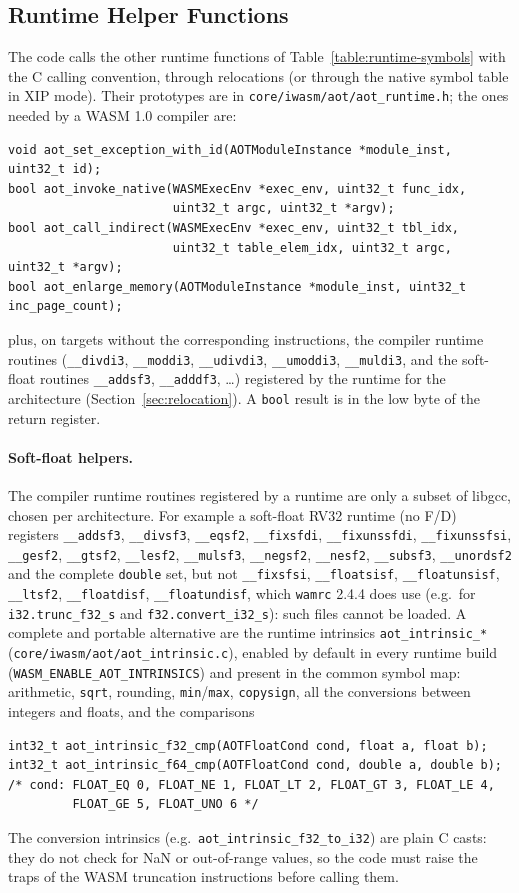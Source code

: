 \documentclass{article}
\begin{document}
\subsection{Runtime Helper Functions}
\label{sec:abi-runtime-calls}
The code calls the other runtime functions of Table~\ref{table:runtime-symbols} with the C calling convention, through relocations (or through the native symbol table in XIP mode).
Their prototypes are in \texttt{core/iwasm/aot/aot\_runtime.h}; the ones needed by a WASM 1.0 compiler are:
\begin{verbatim}
void aot_set_exception_with_id(AOTModuleInstance *module_inst, uint32_t id);
bool aot_invoke_native(WASMExecEnv *exec_env, uint32_t func_idx,
                       uint32_t argc, uint32_t *argv);
bool aot_call_indirect(WASMExecEnv *exec_env, uint32_t tbl_idx,
                       uint32_t table_elem_idx, uint32_t argc, uint32_t *argv);
bool aot_enlarge_memory(AOTModuleInstance *module_inst, uint32_t inc_page_count);
\end{verbatim}
plus, on targets without the corresponding instructions, the compiler runtime routines (\verb|__divdi3|, \verb|__moddi3|, \verb|__udivdi3|, \verb|__umoddi3|, \verb|__muldi3|, and the soft-float routines \verb|__addsf3|, \verb|__adddf3|, \dots) registered by the runtime for the architecture (Section~\ref{sec:relocation}).
A \verb|bool| result is in the low byte of the return register.

\paragraph{Soft-float helpers.}
The compiler runtime routines registered by a runtime are only a subset of libgcc, chosen per architecture.
For example a soft-float RV32 runtime (no F/D) registers \verb|__addsf3|, \verb|__divsf3|, \verb|__eqsf2|, \verb|__fixsfdi|, \verb|__fixunssfdi|, \verb|__fixunssfsi|, \verb|__gesf2|, \verb|__gtsf2|, \verb|__lesf2|, \verb|__mulsf3|, \verb|__negsf2|, \verb|__nesf2|, \verb|__subsf3|, \verb|__unordsf2| and the complete \verb|double| set, but not \verb|__fixsfsi|, \verb|__floatsisf|, \verb|__floatunsisf|, \verb|__ltsf2|, \verb|__floatdisf|, \verb|__floatundisf|, which \texttt{wamrc} 2.4.4 does use (e.g.\ for \verb|i32.trunc_f32_s| and \verb|f32.convert_i32_s|): such files cannot be loaded.
A complete and portable alternative are the runtime intrinsics \verb|aot_intrinsic_*| (\texttt{core/iwasm/aot/aot\_intrinsic.c}), enabled by default in every runtime build (\verb|WASM_ENABLE_AOT_INTRINSICS|) and present in the common symbol map: arithmetic, \verb|sqrt|, rounding, \verb|min|/\verb|max|, \verb|copysign|, all the conversions between integers and floats, and the comparisons
\begin{verbatim}
int32_t aot_intrinsic_f32_cmp(AOTFloatCond cond, float a, float b);
int32_t aot_intrinsic_f64_cmp(AOTFloatCond cond, double a, double b);
/* cond: FLOAT_EQ 0, FLOAT_NE 1, FLOAT_LT 2, FLOAT_GT 3, FLOAT_LE 4,
         FLOAT_GE 5, FLOAT_UNO 6 */
\end{verbatim}
The conversion intrinsics (e.g.\ \verb|aot_intrinsic_f32_to_i32|) are plain C casts: they do not check for NaN or out-of-range values, so the code must raise the traps of the WASM truncation instructions before calling them.
\end{document}
